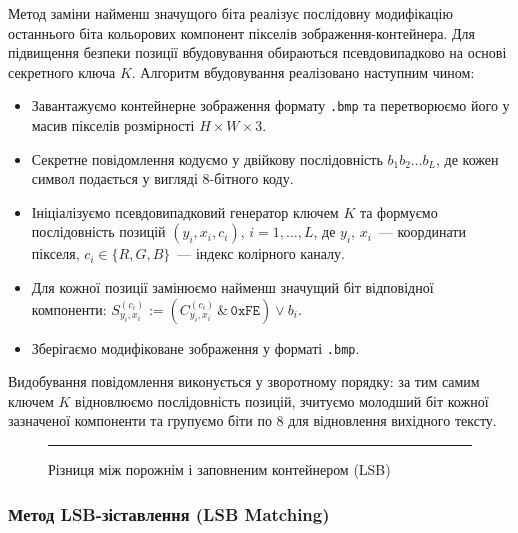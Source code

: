 Метод заміни найменш значущого біта реалізує послідовну модифікацію
останнього біта кольорових компонент пікселів зображення-контейнера. Для
підвищення безпеки позиції вбудовування обираються псевдовипадково на
основі секретного ключа $K$. Алгоритм вбудовування реалізовано наступним
чином:
\begin{itemize}
    \item Завантажуємо контейнерне зображення формату \texttt{.bmp} та
    перетворюємо його у масив пікселів розмірності $H \times W \times 3$.
    \item Секретне повідомлення кодуємо у двійкову послідовність
    $b_1 b_2 \dots b_L$, де кожен символ подається у вигляді 8-бітного коду.
    \item Ініціалізуємо псевдовипадковий генератор ключем $K$ та формуємо
    послідовність позицій $(y_i, x_i, c_i)$, $i = 1, \dots, L$, де $y_i$,
    $x_i$~--- координати пікселя, $c_i \in \{R, G, B\}$~--- індекс
    колірного каналу.
    \item Для кожної позиції замінюємо найменш значущий біт відповідної
    компоненти: $S_{y_i, x_i}^{(c_i)} := (C_{y_i, x_i}^{(c_i)} \,\&\, \texttt{0xFE}) \lor b_i$.
    \item Зберігаємо модифіковане зображення у форматі \texttt{.bmp}.
\end{itemize}
Видобування повідомлення виконується у зворотному порядку: за тим самим
ключем $K$ відновлюємо послідовність позицій, зчитуємо молодший біт кожної
зазначеної компоненти та групуємо біти по 8 для відновлення вихідного
тексту.

\begin{figure}[h!]
    \centering
    \rule{0.8\textwidth}{4cm}
    \caption{Різниця між порожнім і заповненим контейнером (LSB)}
    \label{fig:lsb-diff}
\end{figure}

\subsubsection*{Метод LSB-зіставлення (LSB Matching)}

